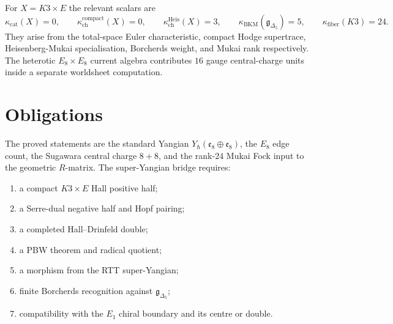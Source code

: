 \documentclass[11pt]{article}
\providecommand{\kcat}{\kappa_{\mathrm{cat}}}
\providecommand{\kch}{\kappa_{\mathrm{ch}}}
\providecommand{\kBKM}{\kappa_{\mathrm{BKM}}}
\providecommand{\kfib}{\kappa_{\mathrm{fiber}}}
\begin{document}
For \(X=K3\times E\) the relevant scalars are
\[
  \kcat(X)=0,\qquad
  \kch^{\mathrm{compact}}(X)=0,\qquad
  \kch^{\mathrm{Heis}}(X)=3,\qquad
  \kBKM(\mathfrak g_{\Delta_5})=5,\qquad
  \kfib(K3)=24.
\]
They arise from the total-space Euler characteristic, compact Hodge
supertrace, Heisenberg-Mukai specialisation, Borcherds weight, and
Mukai rank respectively.  The heterotic \(E_8\times E_8\) current
algebra contributes \(16\) gauge central-charge units inside a separate
worldsheet computation.

\section{Obligations}
\label{sec:obligations}

The proved statements are the standard Yangian
\(Y_\hbar(\mathfrak e_8\oplus\mathfrak e_8)\), the \(E_8\) edge count,
the Sugawara central charge \(8+8\), and the rank-\(24\) Mukai Fock
input to the geometric \(R\)-matrix.  The super-Yangian bridge requires:
\begin{enumerate}[label=\textup{(\arabic*)}]
\item a compact \(K3\times E\) Hall positive half;
\item a Serre-dual negative half and Hopf pairing;
\item a completed Hall--Drinfeld double;
\item a PBW theorem and radical quotient;
\item a morphism from the RTT super-Yangian;
\item finite Borcherds recognition against \(\mathfrak g_{\Delta_5}\);
\item compatibility with the \(E_1\) chiral boundary and its centre or
double.
\end{enumerate}
\end{document}
